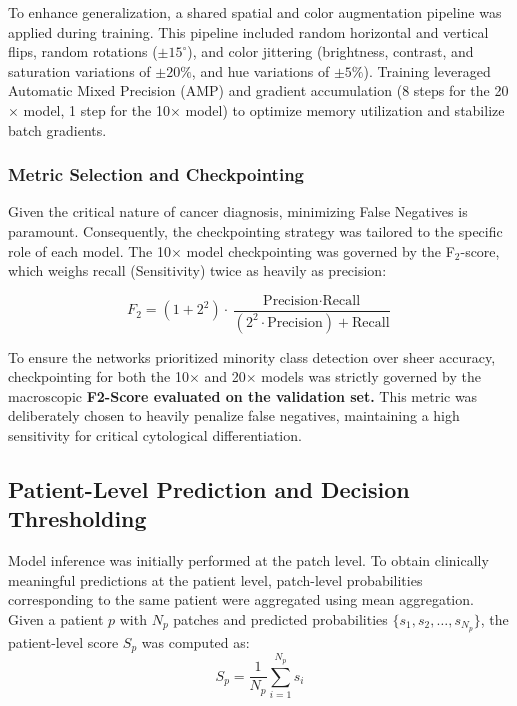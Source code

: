 \documentclass[conference]{IEEEtran}
\begin{document}
To enhance generalization, a shared spatial and color augmentation 
pipeline was applied during training. This pipeline included random 
horizontal and vertical flips, random rotations ($\pm15^\circ$), and 
color jittering (brightness, contrast, and saturation variations of $\pm20\%$, 
and hue variations of $\pm5\%$). Training leveraged Automatic Mixed Precision (AMP) 
and gradient accumulation 
(8 steps for the 20$\times$ model, 1 step for the 10$\times$ model) to optimize 
memory utilization and stabilize batch gradients.

\subsubsection{Metric Selection and Checkpointing}
Given the critical nature of cancer diagnosis, minimizing False Negatives is paramount. 
Consequently, the checkpointing strategy was tailored to the specific role of each model. 
The 10$\times$ model checkpointing was governed by the F$_2$-score, which weighs recall (Sensitivity) 
twice as heavily as precision:

\begin{equation}
    F_2 = (1 + 2^2) \cdot \frac{\text{Precision} \cdot \text{Recall}}{(2^2 \cdot \text{Precision}) + \text{Recall}}
    \label{eq:f2_score}
\end{equation}

To ensure the networks prioritized minority class detection over sheer accuracy, 
checkpointing for both the 10$\times$ and 20$\times$ models was strictly 
governed by the macroscopic \textbf{F2-Score evaluated on the validation set.} 
This metric was deliberately chosen to heavily penalize false negatives, 
maintaining a high sensitivity for critical cytological differentiation.

\subsection{Patient-Level Prediction and Decision Thresholding}
Model inference was initially performed at the patch level. To obtain clinically meaningful predictions at the patient level, patch-level probabilities corresponding to the same patient were aggregated using mean aggregation. Given a patient $p$ with $N_p$ patches and predicted probabilities $\{s_1, s_2, \ldots, s_{N_p}\}$, the patient-level score $S_p$ was computed as:
\begin{equation}
    S_p = \frac{1}{N_p} \sum_{i=1}^{N_p} s_i
\end{equation}
\end{document}
